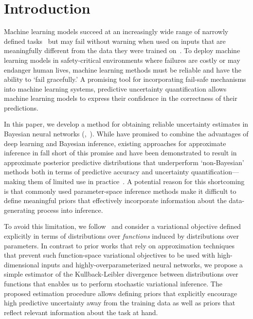 %

\section{Introduction}
\label{sec:intro}

%
Machine learning models succeed at an increasingly wide range of narrowly defined tasks~\citep{alexnet,mnih2013playing,alphago,alphafold} but may fail without warning when used on inputs that are meaningfully different from the data they were trained on~\citep{amodei2016open,hendrycks2021unsolved,rudner2021aisafety,rudner2021robustness}.
To deploy machine learning models in safety-critical environments where failures are costly or may endanger human lives, machine learning methods must be reliable and have the ability to `fail gracefully.'
A promising tool for incorporating fail-safe mechanisms into machine learning systems, predictive uncertainty quantification allows machine learning models to express their confidence in the correctness of their predictions.


%
In this paper, we develop a method for obtaining reliable uncertainty estimates in Bayesian neural networks (\bnns,~\citet{neal1996bayesian}).
While \bnns have promised to combine the advantages of deep learning and Bayesian inference, existing approaches for approximate inference in \bnns fall short of this promise and have been demonstrated to result in approximate posterior predictive distributions that underperform `non-Bayesian' methods both in terms of predictive accuracy and uncertainty quantification---making them of limited use in practice~\citep{ovadia2019uncertainty,foong2019inbetween,farquhar2020radial,Band2021benchmarking}.
%
A potential reason for this shortcoming is that commonly used parameter-space inference methods make it difficult to define meaningful priors that effectively incorporate information about the data-generating process into inference.


%


To avoid this limitation, we follow~\citet{sun2019fbnn} and consider a variational objective defined explicitly in terms of distributions over \emph{functions} induced by distributions over parameters.
In contrast to prior works that rely on approximation techniques that prevent such function-space variational objectives to be used with high-dimensional inputs and highly-overparameterized neural networks, we propose a simple estimator of the Kullback-Leibler divergence between distributions over functions that enables us to perform stochastic variational inference.
The proposed estimation procedure allows defining priors that explicitly encourage high predictive uncertainty away from the training data as well as priors that reflect relevant information about the task at hand.

